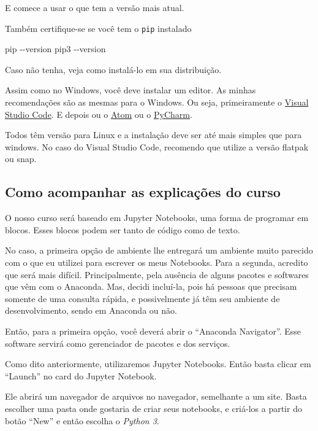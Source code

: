 \documentclass[a4paper, 11pt, brazilian]{article}
\newenvironment{Shaded}{}{}
\newcommand{\ExtensionTok}[1]{{#1}}
\newcommand{\AttributeTok}[1]{\textcolor[rgb]{0.49,0.56,0.16}{{#1}}}
\begin{document}
E comece a usar o que tem a versão mais atual.

Também certifique-se se você tem o \texttt{pip} instalado

\begin{Shaded}
\begin{Highlighting}[]
\ExtensionTok{pip} \AttributeTok{{-}{-}version}
\ExtensionTok{pip3} \AttributeTok{{-}{-}version}
\end{Highlighting}
\end{Shaded}

Caso não tenha, veja como instalá-lo em sua distribuição.

Assim como no Windows, você deve instalar um editor. As minhas
recomendações são as mesmas para o Windows. Ou seja, primeiramente o
\href{https://code.visualstudio.com/}{Visual Studio Code}. E depois ou o
\href{https://atom.io/}{Atom} ou o
\href{https://www.jetbrains.com/pt-br/pycharm/download/}{PyCharm}.

Todos têm versão para Linux e a instalação deve ser até mais simples que
para windows. No caso do Visual Studio Code, recomendo que utilize a
versão flatpak ou snap.

\hypertarget{como-acompanhar-as-explicauxe7uxf5es-do-curso}{%
\subsection{Como acompanhar as explicações do
curso}\label{como-acompanhar-as-explicauxe7uxf5es-do-curso}}

O nosso curso será baseado em Jupyter Notebooks, uma forma de programar
em blocos. Esses blocos podem ser tanto de código como de texto.

No caso, a primeira opção de ambiente lhe entregará um ambiente muito
parecido com o que eu utilizei para escrever os meus Notebooks. Para a
segunda, acredito que será mais difícil. Principalmente, pela ausência
de alguns pacotes e softwares que vêm com o Anaconda. Mas, decidi
incluí-la, pois há pessoas que precisam somente de uma consulta rápida,
e possivelmente já têm seu ambiente de desenvolvimento, sendo em
Anaconda ou não.

Então, para a primeira opção, você deverá abrir o ``Anaconda
Navigator''. Esse software servirá como gerenciador de pacotes e dos
serviços.

Como dito anteriormente, utilizaremos Jupyter Notebooks. Então basta
clicar em ``Launch'' no card do Jupyter Notebook.

Ele abrirá um navegador de arquivos no navegador, semelhante a um site.
Basta escolher uma pasta onde gostaria de criar seus notebooks, e
criá-los a partir do botão ``New'' e então escolha o \emph{Python 3}.
\end{document}
